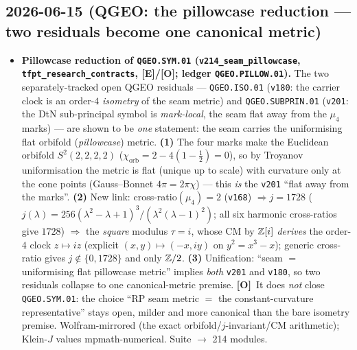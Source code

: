\documentclass[11pt]{article}
\providecommand{\mE}{\textbf{[E]}}\providecommand{\mC}{\textbf{[C]}}
\providecommand{\mO}{\textbf{[O]}}\providecommand{\mX}{\textbf{[X]}}
\begin{document}
\subsection*{2026-06-15 (QGEO: the pillowcase reduction --- two residuals become one canonical metric)}
\begin{itemize}
\item \textbf{Pillowcase reduction of \texttt{QGEO.SYM.01} (\texttt{v214\_seam\_pillowcase},
  \texttt{tfpt\_research\_contracts}, \mE/\mO; ledger \texttt{QGEO.PILLOW.01}).} The two separately-tracked
  open QGEO residuals --- \texttt{QGEO.ISO.01} (\texttt{v180}: the carrier clock is an order-$4$
  \emph{isometry} of the seam metric) and \texttt{QGEO.SUBPRIN.01} (\texttt{v201}: the DtN sub-principal
  symbol is \emph{mark-local}, the seam flat away from the $\mu_4$ marks) --- are shown to be \emph{one}
  statement: the seam carries the uniformising flat orbifold (\emph{pillowcase}) metric. \textbf{(1)} The
  four marks make the Euclidean orbifold $S^2(2,2,2,2)$ ($\chi_{\mathrm{orb}}=2-4(1-\tfrac12)=0$), so by
  Troyanov uniformisation the metric is flat (unique up to scale) with curvature only at the cone points
  (Gauss--Bonnet $4\pi=2\pi\chi$) --- this \emph{is} the \texttt{v201} ``flat away from the marks''.
  \textbf{(2)} New link: cross-ratio$(\mu_4)=2$ (\texttt{v168}) $\Rightarrow j=1728$
  ($j(\lambda)=256(\lambda^2-\lambda+1)^3/(\lambda^2(\lambda-1)^2)$; all six harmonic cross-ratios give
  $1728$) $\Rightarrow$ the \emph{square} modulus $\tau=i$, whose CM by $\mathbb{Z}[i]$ \emph{derives} the order-$4$
  clock $z\mapsto iz$ (explicit $(x,y)\mapsto(-x,iy)$ on $y^2=x^3-x$); generic cross-ratio gives
  $j\notin\{0,1728\}$ and only $\mathbb{Z}/2$. \textbf{(3)} Unification: ``seam $=$ uniformising flat pillowcase
  metric'' implies \emph{both} \texttt{v201} and \texttt{v180}, so two residuals collapse to one
  canonical-metric premise. \mO\ It does \emph{not} close \texttt{QGEO.SYM.01}: the choice ``RP seam metric
  $=$ the constant-curvature representative'' stays open, milder and more canonical than the bare isometry
  premise. Wolfram-mirrored (the exact orbifold/$j$-invariant/CM arithmetic); Klein-$J$ values
  mpmath-numerical. Suite $\to$ 214 modules.
\end{itemize}
\end{document}
